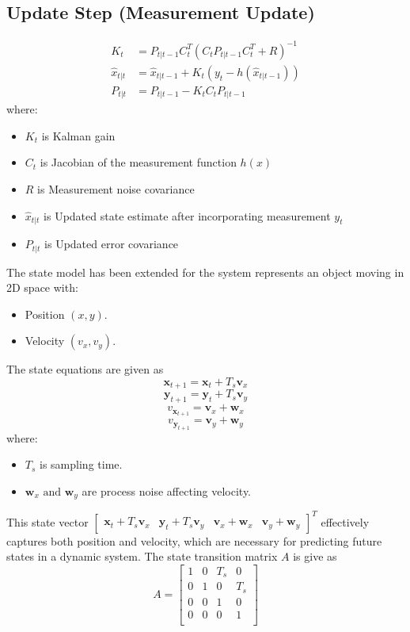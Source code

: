 \documentclass[a4paper,11pt]{article}
\begin{document}
\subsection*{Update Step (Measurement Update)}
\begin{align*}
K_t &= P_{t|t-1} C_t^T (C_t P_{t|t-1} C_t^T + R)^{-1} \\
\hat{x}_{t|t} &= \hat{x}_{t|t-1} + K_t \left( y_t - h(\hat{x}_{t|t-1}) \right) \\
P_{t|t} &= P_{t|t-1} - K_t C_t P_{t|t-1}
\end{align*}
where:
\begin{itemize}
    \item \( K_t \) is Kalman gain
    \item \( C_t \) is Jacobian of the measurement function \( h(x) \)
    \item \( R \) is Measurement noise covariance
    \item \( \hat{x}_{t|t} \) is Updated state estimate after incorporating measurement \( y_t \)
    \item \( P_{t|t} \) is Updated error covariance
\end{itemize}
The state model has been extended for the system represents an object moving in 2D space with:
\begin{itemize}
    \item Position \( (x,y) \).
    \item Velocity \( (v_x,v_y) \).
\end{itemize}
The state equations are given as
\[\mathbf{x}_{t+1} = \mathbf{x}_t + T_s \mathbf{v}_{x}\]
\[\mathbf{y}_{t+1} = \mathbf{y}_t + T_s \mathbf{v}_{y}\]
\[v_{\mathbf{x}_{t+1}} = \mathbf{v}_x + \mathbf{w}_{x}\]
\[v_{\mathbf{y}_{t+1}} = \mathbf{v}_y + \mathbf{w}_{y}\]
where:
\begin{itemize}
    \item \(T_s\) is sampling time.
    \item \(\mathbf{w}_{x} \text{ and } \mathbf{w}_{y}\) are process noise affecting velocity.
\end{itemize}
This state vector \(\begin{bmatrix}
    \mathbf{x}_t + T_s \mathbf{v}_{x} & \mathbf{y}_t + T_s \mathbf{v}_{y}
& \mathbf{v}_x + \mathbf{w}_{x}
& \mathbf{v}_y + \mathbf{w}_{y}
\end{bmatrix}^T\) effectively captures both position and velocity, which are necessary for predicting future states in a dynamic system. The state transition matrix \(A\) is give as
\[A = \begin{bmatrix}
    1 & 0 & T_s & 0 \\ 
    0 & 1 & 0 & T_s \\
    0 & 0 & 1 & 0 \\
    0 & 0 & 0 & 1 \\ \end{bmatrix}\]
\end{document}
